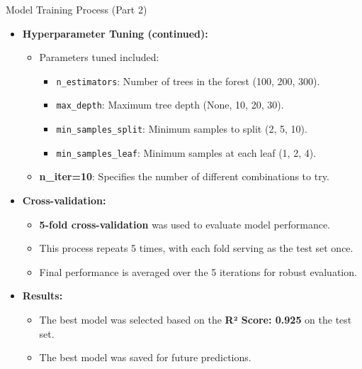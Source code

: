 \documentclass{beamer}
\begin{document}
\begin{frame}{Model Training Process (Part 2)}
    \begin{itemize}
        \item \textbf{Hyperparameter Tuning (continued):}
        \begin{itemize}
            \item Parameters tuned included:
            \begin{itemize}
                \item \texttt{n\_estimators}: Number of trees in the forest (100, 200, 300).
                \item \texttt{max\_depth}: Maximum tree depth (None, 10, 20, 30).
                \item \texttt{min\_samples\_split}: Minimum samples to split (2, 5, 10).
                \item \texttt{min\_samples\_leaf}: Minimum samples at each leaf (1, 2, 4).
            \end{itemize}
            \item \textbf{n\_iter=10}: Specifies the number of different combinations to try.
        \end{itemize}

        \item \textbf{Cross-validation:}
        \begin{itemize}
            \item \textbf{5-fold cross-validation} was used to evaluate model performance.
            \item This process repeats 5 times, with each fold serving as the test set once.
            \item Final performance is averaged over the 5 iterations for robust evaluation.
        \end{itemize}
        
        \item \textbf{Results:}
        \begin{itemize}
            \item The best model was selected based on the \textbf{R² Score: 0.925} on the test set.
            \item The best model was saved for future predictions.
        \end{itemize}
    \end{itemize}
\end{frame}
\end{document}
